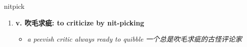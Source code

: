 
\begin{frame}
{\huge nitpick}
\begin{center}
\begin{enumerate}\Large
  \item \textbf{v. 吹毛求疵: to criticize by nit-picking}
  \begin{itemize}
    \item \em{\Large{a peevish critic always ready to quibble 一个总是吹毛求疵的古怪评论家}}
  \end{itemize}
\end{enumerate}
\end{center}
\end{frame}
